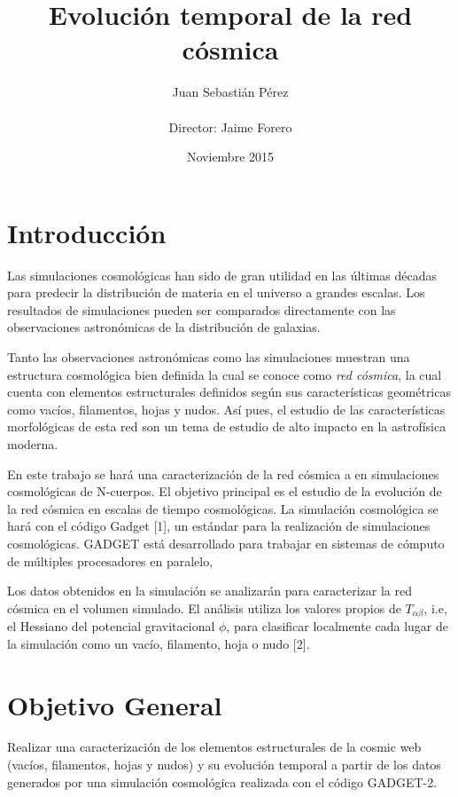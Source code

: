 \documentclass{article}
\title{Evoluci\'on temporal de la red c\'osmica}
\author{Juan Sebastián Pérez\\ \\Director: Jaime Forero}
\date{Noviembre 2015}
\begin{document}
\maketitle

\section{Introducción}

Las simulaciones cosmológicas han sido de gran utilidad en las últimas
décadas para predecir la distribuci\'on de materia en el universo a
grandes escalas.  Los resultados de simulaciones pueden ser
comparados directamente con las observaciones astron\'omicas de la
distribuci\'on de galaxias.

Tanto las observaciones astronómicas como las simulaciones muestran
una estructura cosmológica bien definida la cual se conoce como
\emph{red c\'osmica}, la cual cuenta con elementos estructurales
definidos según sus características geométricas como vacíos,
filamentos, hojas y nudos.  Así pues, el estudio de las
características morfológicas de esta red son un tema de estudio de
alto impacto en la astrofísica moderna.

En este trabajo se har\'a una caracterización de la red c\'osmica a en
simulaciones cosmológicas de N-cuerpos.  El objetivo principal es el
estudio de la evoluci\'on de la red c\'osmica en escalas de tiempo
cosmol\'ogicas.  La simulación cosmol\'ogica se hará con el c\'odigo
Gadget [1], un estándar para la realización de simulaciones
cosmológicas. GADGET est\'a desarrollado para trabajar en sistemas de
cómputo de múltiples procesadores en paralelo,

Los datos obtenidos en la simulación se analizar\'an para caracterizar
la red c\'osmica en el volumen simulado.  El an\'alisis utiliza los
valores propios de $T_{\alpha \beta}$, i.e, el Hessiano del potencial
gravitacional $\phi$, para clasificar localmente cada lugar de la
simulaci\'on como un vac\'io, filamento, hoja o nudo [2].


\section{Objetivo General}

Realizar una caracterización de los elementos estructurales de la
cosmic web (vacíos, filamentos, hojas y nudos) y su evolución temporal
a partir de los datos generados por una simulación cosmológica
realizada con el código GADGET-2.  
\end{document}
